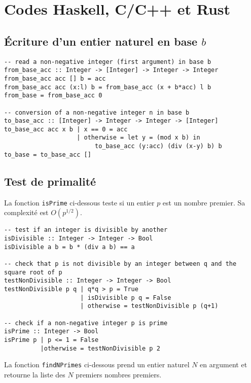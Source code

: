\section{Codes Haskell, C/C++ et Rust}

\subsection{Écriture d'un entier naturel en base \texorpdfstring{$b$}{b}}
\label{app:Haskell_baseb}

\begin{verbatim}
-- read a non-negative integer (first argument) in base b
from_base_acc :: Integer -> [Integer] -> Integer -> Integer
from_base_acc acc [] b = acc
from_base_acc acc (x:l) b = from_base_acc (x + b*acc) l b 
from_base = from_base_acc 0

-- conversion of a non-negative integer n in base b
to_base_acc :: [Integer] -> Integer -> Integer -> [Integer]
to_base_acc acc x b | x == 0 = acc
                    | otherwise = let y = (mod x b) in 
                         to_base_acc (y:acc) (div (x-y) b) b
to_base = to_base_acc []
\end{verbatim}

\subsection{Test de primalité}
\label{app:Haskell_primalité}

\noindent 
La fonction \texttt{isPrime} ci-dessous teste si un entier $p$ est un nombre premier. 
Sa complexité est $O \left( p^{1/2} \right)$.

\begin{verbatim}
-- test if an integer is divisible by another
isDivisible :: Integer -> Integer -> Bool
isDivisible a b = b * (div a b) == a

-- check that p is not divisible by an integer between q and the square root of p
testNonDivisible :: Integer -> Integer -> Bool
testNonDivisible p q | q*q > p = True
                     | isDivisible p q = False
                     | otherwise = testNonDivisible p (q+1)

-- check if a non-negative integer p is prime
isPrime :: Integer -> Bool
isPrime p | p <= 1 = False
          |otherwise = testNonDivisible p 2
\end{verbatim}

\noindent
La fonction \texttt{findNPrimes} ci-dessous prend un entier naturel $N$ en argument et retourne la liste des $N$ premiers nombres premiers. 
\inputminted{Haskell}{Ensembles_Arithmétique/Code/FindNPrimes.hs}

